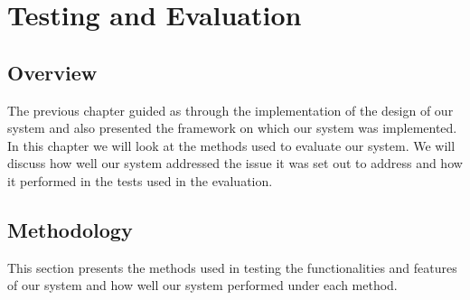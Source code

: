 \section{Testing and Evaluation}
\subsection{Overview}
The previous chapter guided as through the implementation of the design of our system and also presented the framework on which our system was implemented. In this chapter we will look at the methods used to evaluate our system. We will discuss how well our system addressed the issue it was set out to address and how it performed in the tests used in the evaluation.
\subsection{Methodology}
This section presents the methods used in testing the functionalities and features of our system and how well our system performed under each method.

